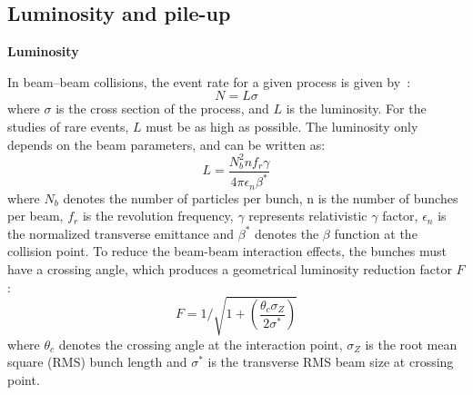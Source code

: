 \subsection{Luminosity and pile-up}

\textbf{Luminosity}

In beam–beam collisions, the event rate for a given process is given by~\cite{Evans_2008}:
\begin{equation}
	N = L\sigma
\end{equation}
where $\sigma$ is the cross section of the process, and $L$ is the luminosity.
For the studies of rare events, $L$ must be as high as possible.
The luminosity only depends on the beam parameters, and can be written as:
\begin{equation} \label{eq:lumi}
	L = \frac{ N_{b}^{2} n f_{r} \gamma}{4\pi \epsilon_{n} \beta^{*}}
\end{equation}
where $N_{b}$ denotes the number of particles per bunch, n is the number of bunches per beam,
$f_{r}$ is the revolution frequency, $\gamma$ represents relativistic $\gamma$ factor, 
$\epsilon_{n}$ is the normalized transverse emittance and $\beta^{*}$ denotes the $\beta$ function at the collision point.
To reduce the beam-beam interaction effects, the bunches must have a crossing angle,
which produces a geometrical luminosity reduction factor $F$:
\begin{equation}
	F = 1 / \sqrt{1 + \left( \frac{\theta_{c}\sigma_{Z}}{2\sigma^{*}} \right) }
\end{equation}
where $\theta_{c}$ denotes the crossing angle at the interaction point, $\sigma_{Z}$ is the root mean square (RMS) bunch length
and $\sigma^{*}$ is the transverse RMS beam size at crossing point.

